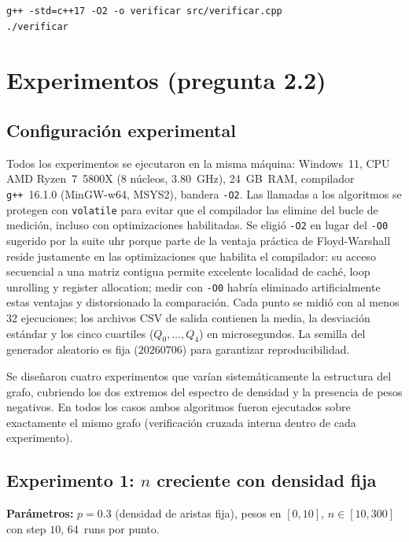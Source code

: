 \documentclass[11pt]{article}
\begin{document}
\begin{lstlisting}[style=texto]
g++ -std=c++17 -O2 -o verificar src/verificar.cpp
./verificar
\end{lstlisting}

\section{Experimentos (pregunta 2.2)}
\label{sec:experimentos}

\subsection{Configuración experimental}

Todos los experimentos se ejecutaron en la misma máquina:
Windows~11, CPU AMD Ryzen~7~5800X (8 núcleos, 3.80~GHz), 24~GB~RAM,
compilador \texttt{g++}~16.1.0 (MinGW-w64, MSYS2), bandera \texttt{-O2}.
Las llamadas a los algoritmos se protegen con \texttt{volatile} para evitar
que el compilador las elimine del bucle de medición, incluso con
optimizaciones habilitadas. Se eligió \texttt{-O2} en lugar del
\texttt{-O0} sugerido por la suite uhr porque parte de la ventaja práctica
de Floyd-Warshall reside justamente en las optimizaciones que habilita el
compilador: su acceso secuencial a una matriz contigua permite excelente
localidad de caché, loop unrolling y register allocation; medir con
\texttt{-O0} habría eliminado artificialmente estas ventajas y distorsionado
la comparación. Cada punto se midió con al menos 32 ejecuciones; los archivos CSV de salida contienen la media,
la desviación estándar y los cinco cuartiles ($Q_0,\dots,Q_4$) en
microsegundos. La semilla del generador aleatorio es fija ($20260706$) para
garantizar reproducibilidad. 

Se diseñaron cuatro experimentos que varían sistemáticamente la estructura
del grafo, cubriendo los dos extremos del espectro de densidad y la presencia
de pesos negativos. En todos los casos ambos algoritmos fueron ejecutados
sobre exactamente el mismo grafo (verificación cruzada interna dentro de cada
experimento).

\pagebreak

\subsection{Experimento 1: $n$ creciente con densidad fija}

\textbf{Parámetros:} $p=0.3$ (densidad de aristas fija), pesos en $[0,10]$,
$n\in[10,300]$ con step $10$, 64~runs por punto.
\end{document}
